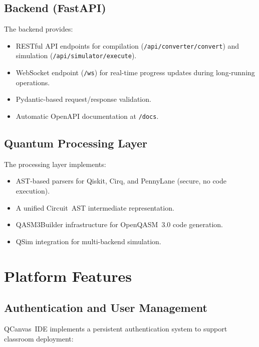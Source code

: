 \documentclass[conference]{IEEEtran}
\begin{document}
\subsection{Backend (FastAPI)}

The backend provides:
\begin{itemize}
    \item RESTful API endpoints for compilation (\texttt{/api/converter/convert}) and simulation (\texttt{/api/simulator/execute}).
    \item WebSocket endpoint (\texttt{/ws}) for real-time progress updates during long-running operations.
    \item Pydantic-based request/response validation.
    \item Automatic OpenAPI documentation at \texttt{/docs}.
\end{itemize}

\subsection{Quantum Processing Layer}

The processing layer implements:
\begin{itemize}
    \item AST-based parsers for Qiskit, Cirq, and PennyLane (secure, no code execution).
    \item A unified Circuit~AST intermediate representation.
    \item QASM3Builder infrastructure for OpenQASM~3.0 code generation.
    \item QSim integration for multi-backend simulation.
\end{itemize}

\section{Platform Features}
\label{sec:features}

\subsection{Authentication and User Management}

QCanvas~IDE implements a persistent authentication system to support classroom deployment:
\end{document}
